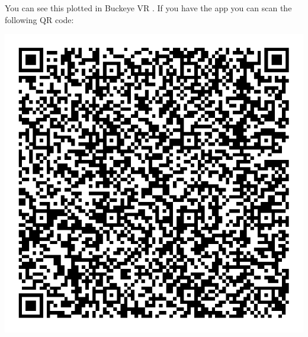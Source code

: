 \documentclass{ximera}
\begin{document}
You can see this plotted in Buckeye VR
.
If you have the app you can scan the following QR code:
\begin{image}
\includegraphics{bvrQR3.png}  
\end{image}
\end{document}
